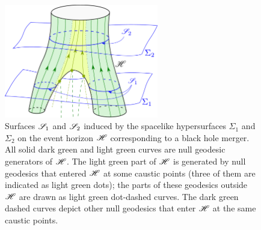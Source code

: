 \begin{figure}
\centerline{\includegraphics[width=0.6\textwidth]{evo_area_theorem.pdf}}
\caption[]{\label{f:evo:area_theorem} \footnotesize
Surfaces $\mathscr{S}_1$ and $\mathscr{S}_2$ induced by the spacelike hypersurfaces $\Sigma_1$
and $\Sigma_2$ on the event horizon $\mathscr{H}$ corresponding to a black hole merger.
All solid dark green and light green curves are null geodesic generators of $\mathscr{H}$.
The light green part of $\mathscr{H}$ is generated by null geodesics that
entered $\mathscr{H}$ at some caustic points (three of them are indicated as
light green dots); the parts of these geodesics outside $\mathscr{H}$ are drawn as
light green dot-dashed curves. The dark green dashed curves depict other null geodesics that
enter $\mathscr{H}$ at the same caustic points.}
\end{figure}


